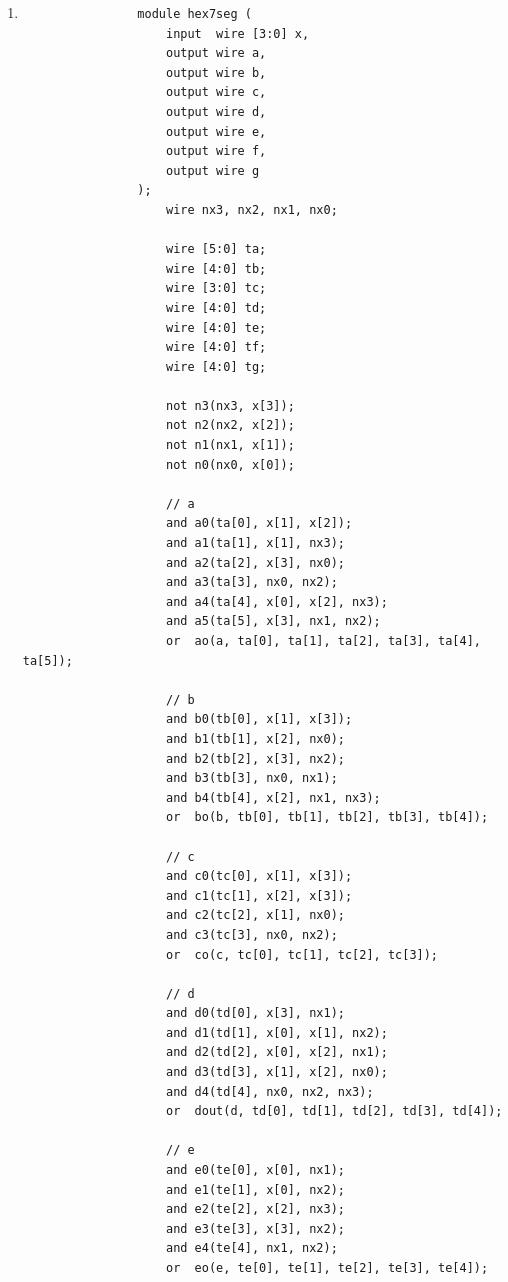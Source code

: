 \begin{problem}
\begin{solution}
\begin{enumerate}
            \item[\textbf{3)}]
            
            \begin{verbatim}
                module hex7seg (
                    input  wire [3:0] x,
                    output wire a,
                    output wire b,
                    output wire c,
                    output wire d,
                    output wire e,
                    output wire f,
                    output wire g
                );
                    wire nx3, nx2, nx1, nx0;

                    wire [5:0] ta;
                    wire [4:0] tb;
                    wire [3:0] tc;
                    wire [4:0] td;
                    wire [4:0] te;
                    wire [4:0] tf;
                    wire [4:0] tg;

                    not n3(nx3, x[3]);
                    not n2(nx2, x[2]);
                    not n1(nx1, x[1]);
                    not n0(nx0, x[0]);

                    // a
                    and a0(ta[0], x[1], x[2]);
                    and a1(ta[1], x[1], nx3);
                    and a2(ta[2], x[3], nx0);
                    and a3(ta[3], nx0, nx2);
                    and a4(ta[4], x[0], x[2], nx3);
                    and a5(ta[5], x[3], nx1, nx2);
                    or  ao(a, ta[0], ta[1], ta[2], ta[3], ta[4], ta[5]);

                    // b
                    and b0(tb[0], x[1], x[3]);
                    and b1(tb[1], x[2], nx0);
                    and b2(tb[2], x[3], nx2);
                    and b3(tb[3], nx0, nx1);
                    and b4(tb[4], x[2], nx1, nx3);
                    or  bo(b, tb[0], tb[1], tb[2], tb[3], tb[4]);

                    // c
                    and c0(tc[0], x[1], x[3]);
                    and c1(tc[1], x[2], x[3]);
                    and c2(tc[2], x[1], nx0);
                    and c3(tc[3], nx0, nx2);
                    or  co(c, tc[0], tc[1], tc[2], tc[3]);

                    // d
                    and d0(td[0], x[3], nx1);
                    and d1(td[1], x[0], x[1], nx2);
                    and d2(td[2], x[0], x[2], nx1);
                    and d3(td[3], x[1], x[2], nx0);
                    and d4(td[4], nx0, nx2, nx3);
                    or  dout(d, td[0], td[1], td[2], td[3], td[4]);

                    // e
                    and e0(te[0], x[0], nx1);
                    and e1(te[1], x[0], nx2);
                    and e2(te[2], x[2], nx3);
                    and e3(te[3], x[3], nx2);
                    and e4(te[4], nx1, nx2);
                    or  eo(e, te[0], te[1], te[2], te[3], te[4]);


\end{verbatim}
\end{enumerate}
\end{solution}
\end{problem}

